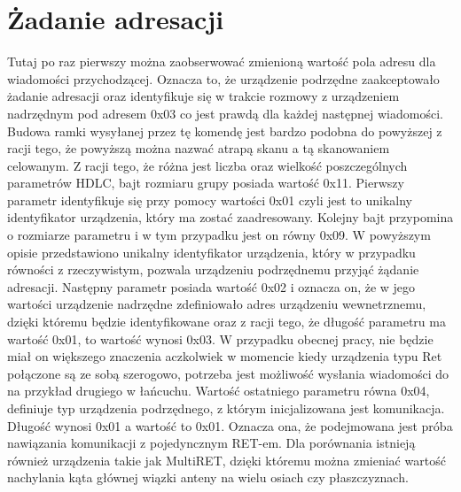 \section{Żadanie adresacji}
Tutaj po raz pierwszy można zaobserwować zmienioną wartość pola adresu dla wiadomości
przychodzącej. Oznacza to, że urządzenie podrzędne zaakceptowało żadanie adresacji 
oraz identyfikuje się w trakcie rozmowy z urządzeniem nadrzędnym pod adresem 0x03 co
jest prawdą dla każdej następnej wiadomości.
\newline\newline
Budowa ramki wysyłanej przez tę komendę jest bardzo podobna do powyższej z racji tego, że powyższą można nazwać atrapą skanu a tą skanowaniem celowanym.
Z racji tego, że różna jest liczba oraz wielkość poszczególnych parametrów HDLC, bajt rozmiaru grupy posiada wartość 0x11.
\newline
Pierwszy parametr identyfikuje się przy pomocy wartości 0x01 czyli jest to unikalny identyfikator urządzenia, który ma zostać zaadresowany.
Kolejny bajt przypomina o rozmiarze parametru i w tym przypadku jest on równy 0x09. W powyższym opisie przedstawiono unikalny identyfikator urządzenia, który w przypadku
równości z rzeczywistym, pozwala urządzeniu podrzędnemu przyjąć żądanie adresacji.
\newline
Następny parametr posiada wartość 0x02 i oznacza on, że w jego wartości urządzenie nadrzędne zdefiniowało adres urządzeniu wewnetrznemu, dzięki któremu
będzie identyfikowane oraz z racji tego, że długość parametru ma wartość 0x01, to wartość wynosi 0x03. W przypadku obecnej pracy, nie będzie miał on większego znaczenia
aczkolwiek w momencie kiedy urządzenia typu Ret połączone są ze sobą szerogowo, potrzeba jest możliwość wysłania wiadomości do na przykład drugiego w łańcuchu.
\newline
Wartość ostatniego parametru równa 0x04, definiuje typ urządzenia podrzędnego, z którym inicjalizowana jest komunikacja. Długość wynosi 0x01 a wartość to 0x01.
Oznacza ona, że podejmowana jest próba nawiązania komunikacji z pojedyncznym RET-em.
Dla porównania istnieją również urządzenia takie jak MultiRET, dzięki któremu można zmieniać wartość nachylania kąta głównej wiązki anteny na wielu osiach czy płaszczyznach.


